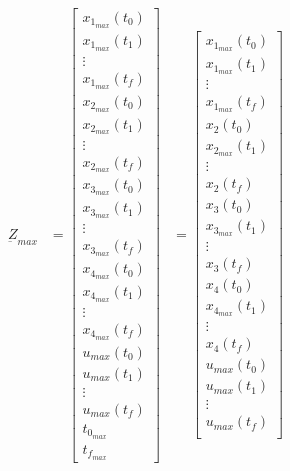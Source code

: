 \documentclass[11pt,usenames]{article}
\begin{document}
	\begin{align}
	\underbar Z_{max} &= 
	\begin{bmatrix}
	x_{1_{max}}(t_{0}) \\ x_{1_{max}}(t_{1}) \\ \vdots \\  x_{1_{max}}(t_{f}) \\  
	x_{2_{max}}(t_{0}) \\ x_{2_{max}}(t_{1}) \\ \vdots \\  x_{2_{max}}(t_{f}) \\ 
	x_{3_{max}}(t_{0}) \\ x_{3_{max}}(t_{1}) \\ \vdots \\  x_{3_{max}}(t_{f}) \\ 
	x_{4_{max}}(t_{0}) \\ x_{4_{max}}(t_{1}) \\ \vdots \\  x_{4_{max}}(t_{f}) \\ 
	u_{max}(t_{0}) \\ u_{max}(t_{1}) \\ \vdots \\  u_{max}(t_{f}) \\ 
	t_{0_{max}} \\ 
	t_{f_{max}}  
	\end{bmatrix}
	&=
	\begin{bmatrix}
	x_{1_{max}}(t_{0}) \\ x_{1_{max}}(t_{1}) \\ \vdots \\  x_{1_{max}}(t_{f}) \\  
	x_{2}(t_{0}) \\ x_{2_{max}}(t_{1}) \\ \vdots \\  x_{2}(t_{f}) \\ 
	x_{3}(t_{0}) \\ x_{3_{max}}(t_{1}) \\ \vdots \\  x_{3}(t_{f}) \\ 
	x_{4}(t_{0}) \\ x_{4_{max}}(t_{1}) \\ \vdots \\  x_{4}(t_{f}) \\ 
	u_{max}(t_{0}) \\ u_{max}(t_{1}) \\ \vdots \\  u_{max}(t_{f}) \\ 

\end{bmatrix}
\end{align}
\end{document}
